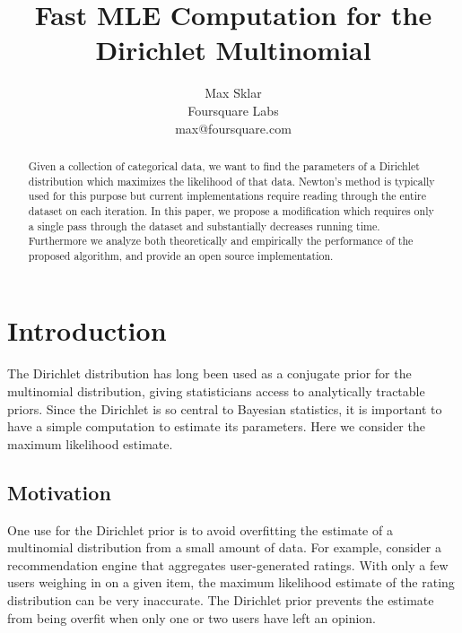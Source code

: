 \documentclass[twoside]{article}
\begin{document}
\parindent=0in
\parskip=12pt

%
%
%
%

\title{Fast MLE Computation for the Dirichlet Multinomial}

\author{Max Sklar\\
Foursquare Labs\\
max@foursquare.com
}

\maketitle
\thispagestyle{empty}

\begin{abstract}
Given a collection of categorical data, we want to find the parameters of a Dirichlet distribution which maximizes the likelihood of that data.  Newton's method is typically used for this purpose but current implementations require reading through the entire dataset on each iteration.  In this paper, we propose a modification which requires only a single pass through the dataset and substantially decreases running time.  Furthermore we analyze both theoretically and empirically the performance of the proposed algorithm, and provide an open source implementation.
\end{abstract}

\section{Introduction}

The Dirichlet distribution has long been used as a conjugate prior for the multinomial distribution, giving statisticians access to analytically tractable priors. Since the Dirichlet is so central to Bayesian statistics, it is important to have a simple computation to estimate its parameters. Here we consider the maximum likelihood estimate.

\subsection{Motivation}

One use for the Dirichlet prior is to avoid overfitting the estimate of a multinomial distribution from a small amount of data.  For example, consider a recommendation engine that aggregates user-generated ratings.  With only a few users weighing in on a given item, the maximum likelihood estimate of the rating distribution can be very inaccurate.  The Dirichlet prior prevents the estimate from being overfit when only one or two users have left an opinion.
\end{document}
